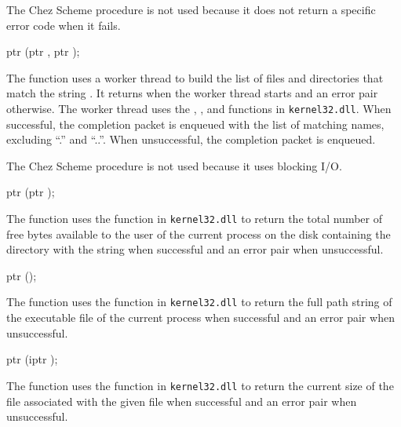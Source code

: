 The Chez Scheme procedure  is not used
because it does not return a specific error code when it fails.

\begin{function}
  ptr (ptr , ptr );
\end{function}\antipar

The  function uses a worker thread to build the
list of files and directories that match the string . It
returns  when the worker thread starts and an error pair
otherwise.  The worker thread uses the ,
, and  functions in
\texttt{kernel32.dll}.  When successful, the completion packet
 is enqueued with the list
of matching names, excluding ``.''  and ``..''. When unsuccessful, the
completion packet  is
enqueued.

The Chez Scheme procedure  is not used because
it uses blocking I/O.

\begin{function}
  ptr (ptr );
\end{function}\antipar

The  function uses the
 function in \texttt{kernel32.dll} to
return the total number of free bytes available to the user of the
current process on the disk containing the directory with the string
 when successful and an error pair when unsuccessful.

\begin{function}
  ptr ();
\end{function}\antipar

The  function uses the
 function in \texttt{kernel32.dll} to
return the full path string of the executable file of the current
process when successful and an error pair when unsuccessful.

\begin{function}
  ptr (iptr );
\end{function}\antipar

The  function uses the 
function in \texttt{kernel32.dll} to return the current size of the
file associated with the given file  when successful and an
error pair when unsuccessful.

